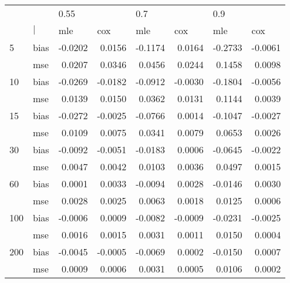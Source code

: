 \begin{table}[ht]
\centering
\begin{tabular}{ll rrrrrr}
  \toprule
     &            & \multicolumn{1}{l}{    0.55} & \multicolumn{1}{l}{        } & \multicolumn{1}{l}{     0.7} & \multicolumn{1}{l}{        } & \multicolumn{1}{l}{     0.9} & \multicolumn{1}{l}{        } \\ 
      &  $\vert$  & \multicolumn{1}{l}{     mle} & \multicolumn{1}{l}{     cox} & \multicolumn{1}{l}{     mle} & \multicolumn{1}{l}{     cox} & \multicolumn{1}{l}{     mle} & \multicolumn{1}{l}{     cox} \\ 
   \midrule
5   & bias       & -0.0202 &  0.0156 & -0.1174 &  0.0164 & -0.2733 & -0.0061 \\ 
      & mse        &  0.0207 &  0.0346 &  0.0456 &  0.0244 &  0.1458 &  0.0098 \\ 
  10  & bias       & -0.0269 & -0.0182 & -0.0912 & -0.0030 & -0.1804 & -0.0056 \\ 
      & mse        &  0.0139 &  0.0150 &  0.0362 &  0.0131 &  0.1144 &  0.0039 \\ 
  15  & bias       & -0.0272 & -0.0025 & -0.0766 &  0.0014 & -0.1047 & -0.0027 \\ 
      & mse        &  0.0109 &  0.0075 &  0.0341 &  0.0079 &  0.0653 &  0.0026 \\ 
  30  & bias       & -0.0092 & -0.0051 & -0.0183 &  0.0006 & -0.0645 & -0.0022 \\ 
      & mse        &  0.0047 &  0.0042 &  0.0103 &  0.0036 &  0.0497 &  0.0015 \\ 
  60  & bias       &  0.0001 &  0.0033 & -0.0094 &  0.0028 & -0.0146 &  0.0030 \\ 
      & mse        &  0.0028 &  0.0025 &  0.0063 &  0.0018 &  0.0125 &  0.0006 \\ 
  100 & bias       & -0.0006 &  0.0009 & -0.0082 & -0.0009 & -0.0231 & -0.0025 \\ 
      & mse        &  0.0016 &  0.0015 &  0.0031 &  0.0011 &  0.0150 &  0.0004 \\ 
  200 & bias       & -0.0045 & -0.0005 & -0.0069 &  0.0002 & -0.0150 &  0.0007 \\ 
      & mse        &  0.0009 &  0.0006 &  0.0031 &  0.0005 &  0.0106 &  0.0002 \\ 
   \bottomrule
\end{tabular}
\end{table}
